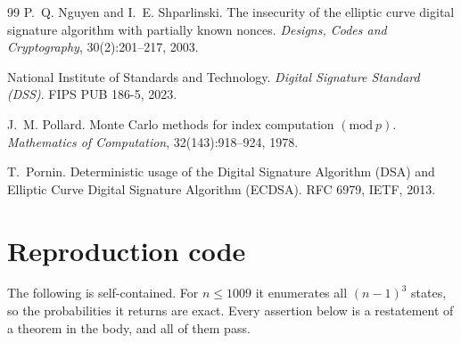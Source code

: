 \documentclass[11pt,a4paper]{article}
\theoremstyle{plain}
\theoremstyle{definition}
\theoremstyle{remark}
\begin{document}
\begin{thebibliography}{99}
P.~Q. Nguyen and I.~E. Shparlinski.
\newblock The insecurity of the elliptic curve digital signature algorithm with partially known
nonces.
\newblock \emph{Designs, Codes and Cryptography}, 30(2):201--217, 2003.

National Institute of Standards and Technology.
\newblock \emph{Digital Signature Standard (DSS)}. FIPS PUB 186-5, 2023.

J.~M. Pollard.
\newblock Monte Carlo methods for index computation $(\mathrm{mod}\ p)$.
\newblock \emph{Mathematics of Computation}, 32(143):918--924, 1978.

T.~Pornin.
\newblock Deterministic usage of the Digital Signature Algorithm (DSA) and Elliptic Curve Digital
Signature Algorithm (ECDSA).
\newblock RFC 6979, IETF, 2013.

\end{thebibliography}

\appendix

\section{Reproduction code}\label{app:code}

The following is self-contained. For $n \le 1009$ it enumerates all $(n-1)^{3}$ states, so the
probabilities it returns are exact. Every assertion below is a restatement of a theorem in the
body, and all of them pass.
\end{document}
